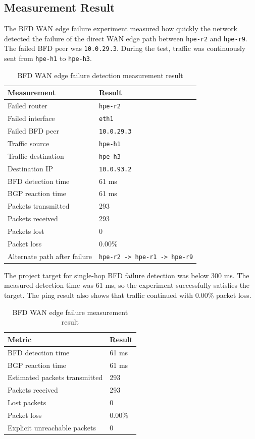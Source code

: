 \subsection{Measurement Result}

The BFD WAN edge failure experiment measured how quickly the network detected the failure of the direct WAN edge path between \texttt{hpe-r2} and \texttt{hpe-r9}. The failed BFD peer was \texttt{10.0.29.3}. During the test, traffic was continuously sent from \texttt{hpe-h1} to \texttt{hpe-h3}.

\begin{table}[H]
\centering
\small
\renewcommand{\arraystretch}{1.25}
\begin{tabular}{|p{6cm}|p{5cm}|}
\hline
\textbf{Measurement} & \textbf{Result} \\
\hline
Failed router & \texttt{hpe-r2} \\
\hline
Failed interface & \texttt{eth1} \\
\hline
Failed BFD peer & \texttt{10.0.29.3} \\
\hline
Traffic source & \texttt{hpe-h1} \\
\hline
Traffic destination & \texttt{hpe-h3} \\
\hline
Destination IP & \texttt{10.0.93.2} \\
\hline
BFD detection time & 61 ms \\
\hline
BGP reaction time & 61 ms \\
\hline
Packets transmitted & 293 \\
\hline
Packets received & 293 \\
\hline
Packets lost & 0 \\
\hline
Packet loss & 0.00\% \\
\hline
Alternate path after failure & \texttt{hpe-r2 -> hpe-r1 -> hpe-r9} \\
\hline
\end{tabular}
\caption{BFD WAN edge failure detection measurement result}
\end{table}

The project target for single-hop BFD failure detection was below 300 ms. The measured detection time was 61 ms, so the experiment successfully satisfies the target. The ping result also shows that traffic continued with 0.00\% packet loss.

\begin{table}[h]
\centering
\begin{tabular}{|l|l|}
\hline
\textbf{Metric} & \textbf{Result} \\
\hline
BFD detection time & 61 ms \\
\hline
BGP reaction time & 61 ms \\
\hline
Estimated packets transmitted & 293 \\
\hline
Packets received & 293 \\
\hline
Lost packets & 0 \\
\hline
Packet loss & 0.00\% \\
\hline
Explicit unreachable packets & 0 \\
\hline
\end{tabular}
\caption{BFD WAN edge failure measurement result}
\end{table}

